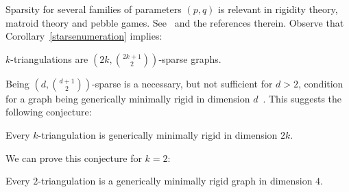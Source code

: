 \documentclass[12pt]{amsart}
\begin{document}
Sparsity for several families of parameters $(p,q)$ is relevant in rigidity theory, matroid theory and pebble games. See~\cite{ls-pgasg-07,st-shpga-07} and the references therein. Observe that Corollary~\ref{starsenumeration} implies:

\begin{corollary}
 $k$-triangulations are $\left(2k,{2k+1 \choose 2}\right)$-sparse graphs.
\end{corollary}


Being $\left(d,{d+1 \choose 2}\right)$-sparse is a necessary, but not sufficient for $d>2$, condition for a graph being generically minimally rigid in dimension $d$~\cite{gss-cr-93}. This suggests the following
conjecture:

\begin{conjecture}
Every $k$-triangulation is generically minimally rigid in dimension $2k$.
\end{conjecture}

We can prove this conjecture for $k=2$:

\begin{theorem}\label{rigid}
Every $2$-triangulation is a generically minimally rigid graph in dimension $4$.
\end{theorem}
\end{document}
